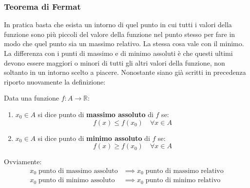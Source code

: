 \subsubsection{Teorema di Fermat} \label{theorem_fermat}
In pratica basta che esista un intorno di quel punto in cui tutti i valori 
della funzione sono più piccoli del valore della funzione nel punto stesso per 
fare in modo che quel punto sia un massimo relativo. La stessa cosa vale con il 
minimo. La differenza con i punti di massimo e di minimo assoluti è che questi 
ultimi devono essere maggiori o minori di tutti gli altri valori della 
funzione, non soltanto in un intorno scelto a piacere. Nonostante siano già 
scritti in precedenza riporto nuovamente la definizione:

Data una funzione $f:A \to \mathbb{R}$:
\begin{enumerate}
    \item $x_0 \in A$ si dice punto di \textbf{massimo assoluto} di $f$ se:
    \begin{equation*}
        f(x) \leq f(x_0) \quad \forall x \in A
    \end{equation*}
    
    \item $x_0 \in A$ si dice punto di \textbf{minimo assoluto} di $f$ se:
    \begin{equation*}
        f(x) \geq f(x_0) \quad \forall x \in A
    \end{equation*}
\end{enumerate}

Ovviamente: \\
\begin{align*}
	x_0 \; \text{punto di massimo assoluto} &\implies x_0 \; \text{punto di 
    massimo relativo}\\
	x_0 \; \text{punto di minimo assoluto} &\implies x_0 \; \text{punto di 
    minimo relativo}
\end{align*}

